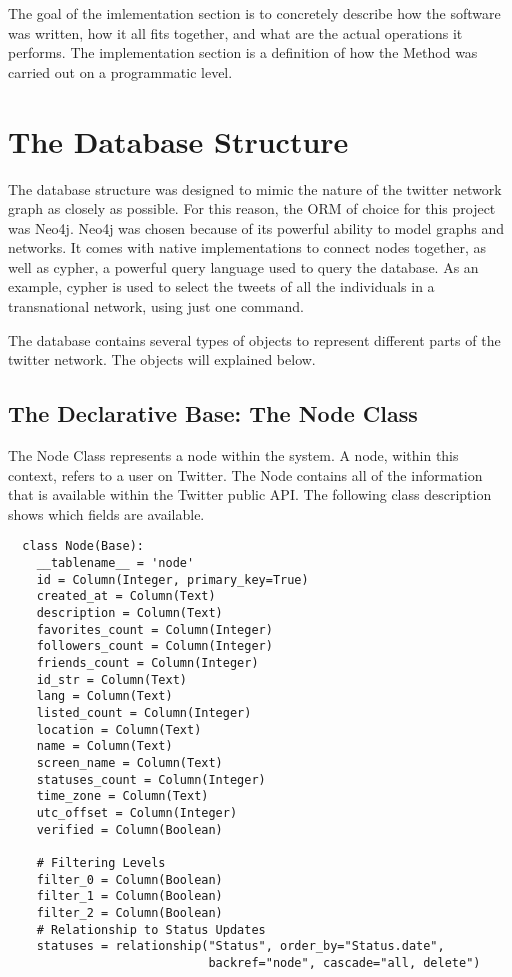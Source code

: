 The goal of the imlementation section is to concretely describe how
the software was written, how it all fits together, and what are the
actual operations it performs. The implementation section is a
definition of how the Method was carried out on a programmatic level.

\section{The Database Structure}
The database structure was designed to mimic the nature of the twitter
network graph as closely as possible. For this reason, the ORM of
choice for this project was Neo4j. Neo4j was chosen because of its
powerful ability to model graphs and networks. It comes with native
implementations to connect nodes together, as well as cypher, a
powerful query language used to query the database. As an example,
cypher is used to select the tweets of all the individuals in a
transnational network, using just one command.

The database contains several types of objects to represent different
parts of the twitter network. The objects will explained below.

\subsection{The Declarative Base: The Node Class}
The Node Class represents a node within the system. A node, within
this context, refers to a user on Twitter. The Node contains all of
the information that is available within the Twitter public API. The
following class description shows which fields are available.

\begin{lstlisting}
  class Node(Base):
    __tablename__ = 'node'
    id = Column(Integer, primary_key=True)
    created_at = Column(Text)
    description = Column(Text)
    favorites_count = Column(Integer)
    followers_count = Column(Integer)
    friends_count = Column(Integer)
    id_str = Column(Text)
    lang = Column(Text)
    listed_count = Column(Integer)
    location = Column(Text)
    name = Column(Text)
    screen_name = Column(Text)
    statuses_count = Column(Integer)
    time_zone = Column(Text)
    utc_offset = Column(Integer)
    verified = Column(Boolean)

    # Filtering Levels
    filter_0 = Column(Boolean)
    filter_1 = Column(Boolean)
    filter_2 = Column(Boolean)
    # Relationship to Status Updates
    statuses = relationship("Status", order_by="Status.date",
                            backref="node", cascade="all, delete")
\end{lstlisting}

